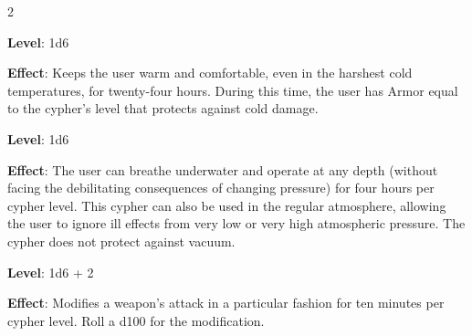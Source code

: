 \begin{multicols}{2}

\textbf{Level}: 1d6

\textbf{Effect}: Keeps the user warm and comfortable, even in the harshest cold temperatures, for twenty-four hours. During this time, the user has Armor equal to the cypher’s level that protects against cold damage.


\textbf{Level}: 1d6

\textbf{Effect}: The user can breathe underwater and operate at any depth (without facing the debilitating consequences of changing pressure) for four hours per cypher level. This cypher can also be used in the regular atmosphere, allowing the user to ignore ill effects from very low or very high atmospheric pressure. The cypher does not protect against vacuum.


\textbf{Level}: 1d6 + 2

\textbf{Effect}: Modifies a weapon’s attack in a particular fashion for ten minutes per cypher level. Roll a d100 for the modification.

\end{multicols}

